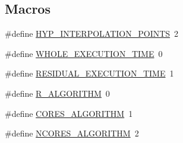 \subsection*{Macros}
\begin{DoxyCompactItemize}
\item 
\#define \hyperlink{application_8hh_a0f42c303bf81baaf28a6fa46e2b3e58e}{H\-Y\-P\-\_\-\-I\-N\-T\-E\-R\-P\-O\-L\-A\-T\-I\-O\-N\-\_\-\-P\-O\-I\-N\-T\-S}~2
\item 
\#define \hyperlink{application_8hh_a15162f95011176c0c692787df838f867}{W\-H\-O\-L\-E\-\_\-\-E\-X\-E\-C\-U\-T\-I\-O\-N\-\_\-\-T\-I\-M\-E}~0
\item 
\#define \hyperlink{application_8hh_acd4b89499372ef05e013036e76151890}{R\-E\-S\-I\-D\-U\-A\-L\-\_\-\-E\-X\-E\-C\-U\-T\-I\-O\-N\-\_\-\-T\-I\-M\-E}~1
\item 
\#define \hyperlink{application_8hh_aaeed326368abd712225f9ca34c338fbf}{R\-\_\-\-A\-L\-G\-O\-R\-I\-T\-H\-M}~0
\item 
\#define \hyperlink{application_8hh_ab83b3ec42b1954cf1ef98a45ef2ae65b}{C\-O\-R\-E\-S\-\_\-\-A\-L\-G\-O\-R\-I\-T\-H\-M}~1
\item 
\#define \hyperlink{application_8hh_a0c205e83d269cb93a701adda1f45156d}{N\-C\-O\-R\-E\-S\-\_\-\-A\-L\-G\-O\-R\-I\-T\-H\-M}~2
\end{DoxyCompactItemize}


